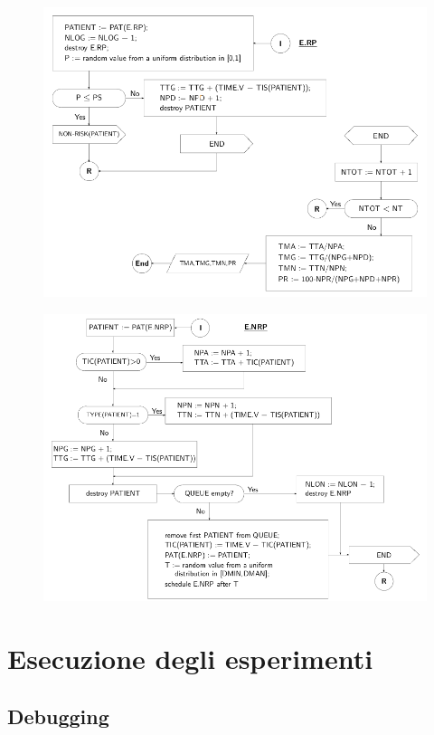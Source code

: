 \documentclass[11pt]{book}
\begin{document}
\begin{figure}[H]
  \centering
  \includegraphics[width=\textwidth]{images/cap11fig42.png}
\end{figure}

\begin{figure}[H]
  \centering
  \includegraphics[width=\textwidth]{images/cap11fig43.png}
\end{figure}

\section{Esecuzione degli esperimenti}

\subsection{Debugging}
\end{document}
